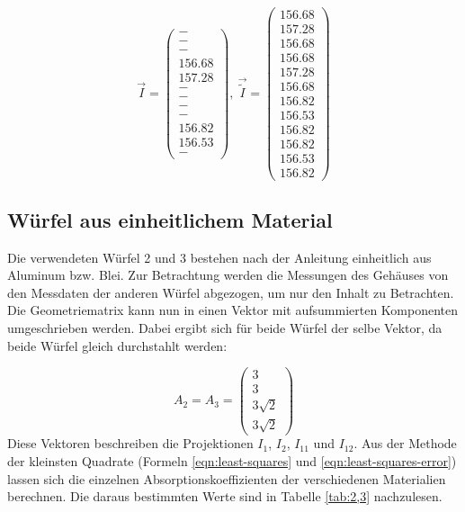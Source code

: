 \begin{equation*}
  \vec{I}=\begin{pmatrix}
        - \\
        - \\
        - \\
        156.68  \\
        157.28  \\
        - \\
        - \\
        - \\
        - \\
        156.82 \\
        156.53 \\
        -
  \end{pmatrix},\
  \vec{\tilde{I}}=\begin{pmatrix}
        156.68 \\
        157.28 \\
        156.68 \\
        156.68 \\
        157.28 \\
        156.68 \\
        156.82 \\
        156.53 \\
        156.82 \\
        156.82 \\
        156.53 \\
        156.82
  \end{pmatrix}
\end{equation*}


\subsection{Würfel aus einheitlichem Material}
Die verwendeten Würfel 2 und 3 bestehen nach der Anleitung \cite{anleitung} einheitlich aus Aluminum bzw.
Blei. Zur Betrachtung werden die Messungen des Gehäuses von den Messdaten der anderen Würfel abgezogen,
um nur den Inhalt zu Betrachten. Die Geometriematrix kann nun in einen
Vektor mit aufsummierten Komponenten umgeschrieben werden. Dabei ergibt sich für beide
Würfel der selbe Vektor, da beide Würfel gleich durchstahlt werden:

\begin{equation*}
  A_2 = A_3 = \begin{pmatrix}
          3 \\
          3 \\
          3\sqrt{2} \\
          3\sqrt{2}
        \end{pmatrix}
\end{equation*}
Diese Vektoren beschreiben die Projektionen $I_1$, $I_2$, $I_{11}$ und $I_{12}$.
Aus der Methode der kleinsten Quadrate (Formeln \eqref{eqn:least-squares} und \eqref{eqn:least-squares-error})
lassen sich die einzelnen Absorptionskoeffizienten der verschiedenen Materialien berechnen.
Die daraus bestimmten Werte sind in Tabelle \ref{tab:2,3} nachzulesen.


